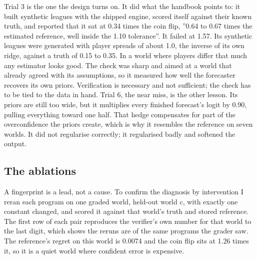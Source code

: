 \documentclass[11pt,letterpaper]{article}
\begin{document}
Trial 3 is the one the design turns on. It did what the handbook points to: it built synthetic leagues with the shipped engine, scored itself against their known truth, and reported that it sat at 0.34 times the coin flip, ''0.64 to 0.67 times the estimated reference, well inside the 1.10 tolerance''. It failed at 1.57. Its synthetic leagues were generated with player spreads of about 1.0, the inverse of its own ridge, against a truth of 0.15 to 0.35. In a world where players differ that much any estimator looks good. The check was sharp and aimed at a world that already agreed with its assumptions, so it measured how well the forecaster recovers its own priors. Verification is necessary and not sufficient; the check has to be tied to the data in hand. Trial 6, the near miss, is the other lesson. Its priors are still too wide, but it multiplies every finished forecast's logit by 0.90, pulling everything toward one half. That hedge compensates for part of the overconfidence the priors create, which is why it resembles the reference on seven worlds. It did not regularise correctly; it regularised badly and softened the output.


\subsection{The ablations}

A fingerprint is a lead, not a cause. To confirm the diagnosis by intervention I reran each program on one graded world, held-out world c, with exactly one constant changed, and scored it against that world's truth and stored reference. The first row of each pair reproduces the verifier's own number for that world to the last digit, which shows the reruns are of the same programs the grader saw. The reference's regret on this world is 0.0074 and the coin flip sits at 1.26 times it, so it is a quiet world where confident error is expensive.
\end{document}
